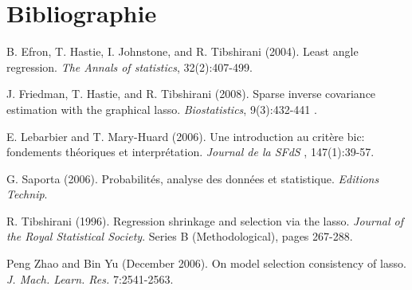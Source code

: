 \documentclass[12pt]{article}
\begin{document}
\section*{Bibliographie}
%

\noindent [1] B. Efron, T. Hastie, I. Johnstone, and R. Tibshirani (2004). Least angle regression. {\it The
Annals of statistics}, 32(2):407-499.

\noindent [2] J. Friedman, T. Hastie, and R. Tibshirani (2008). Sparse inverse covariance estimation with
the graphical lasso.  {\it Biostatistics}, 9(3):432-441 .

\noindent [3] E. Lebarbier and T. Mary-Huard (2006). Une introduction au critère bic: fondements
théoriques et interprétation.  {\it Journal de la SFdS }, 147(1):39-57.

\noindent [4] G. Saporta (2006). Probabilités, analyse des données et statistique.  {\it Editions Technip}.

\noindent[5] R. Tibshirani (1996). Regression shrinkage and selection via the lasso.  {\it Journal of the Royal
Statistical Society}. Series B (Methodological), pages 267-288.

\noindent [6] Peng Zhao and Bin Yu (December 2006). On model selection consistency of lasso. {\it J. Mach. Learn.
Res.} 7:2541-2563.

%
%
%
\end{document}
